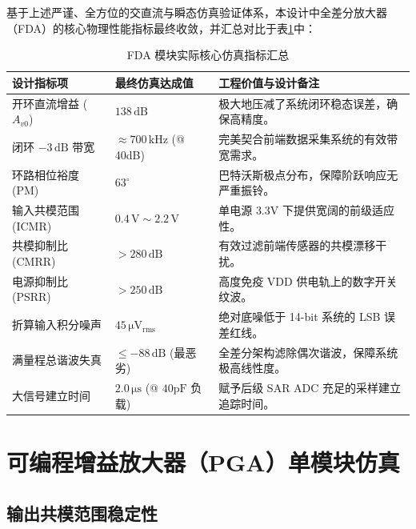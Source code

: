 基于上述严谨、全方位的交直流与瞬态仿真验证体系，本设计中全差分放大器（FDA）的核心物理性能指标最终收敛，并汇总对比于表\ref{tab:fda_final_specs}中：

\begin{table}[H]
\centering
\caption{FDA 模块实际核心仿真指标汇总}
\label{tab:fda_final_specs}
\begin{tabular}{lp{3.5cm}p{7cm}}
\toprule
\textbf{设计指标项} & \textbf{最终仿真达成值} & \textbf{工程价值与设计备注} \\
\midrule
开环直流增益 ($A_{v0}$) & $138\,\mathrm{dB}$ & 极大地压减了系统闭环稳态误差，确保高精度。 \\
闭环 $-3\,\mathrm{dB}$ 带宽 & $\approx 700\,\mathrm{kHz}$ (@ 40dB) & 完美契合前端数据采集系统的有效带宽需求。 \\
环路相位裕度 (PM) & $63^\circ$ & 巴特沃斯极点分布，保障阶跃响应无严重振铃。 \\
输入共模范围 (ICMR) & $0.4\,\mathrm{V} \sim 2.2\,\mathrm{V}$ & 单电源 $3.3\mathrm{V}$ 下提供宽阔的前级适应性。 \\
共模抑制比 (CMRR) & $> 280\,\mathrm{dB}$ & 有效过滤前端传感器的共模漂移干扰。 \\
电源抑制比 (PSRR) & $> 250\,\mathrm{dB}$ & 高度免疫 VDD 供电轨上的数字开关纹波。 \\
折算输入积分噪声 & $45\,\mathrm{\mu V_{rms}}$ & 绝对底噪低于 14-bit 系统的 LSB 误差红线。 \\
满量程总谐波失真 & $\le -88\,\mathrm{dB}$ (最恶劣) & 全差分架构滤除偶次谐波，保障系统极高线性度。 \\
大信号建立时间 & $2.0\,\mathrm{\mu s}$ (@ $40\mathrm{pF}$ 负载) & 赋予后级 SAR ADC 充足的采样建立追踪时间。 \\
\bottomrule
\end{tabular}
\end{table}



\section{可编程增益放大器（PGA）单模块仿真}

\subsection{输出共模范围稳定性}

